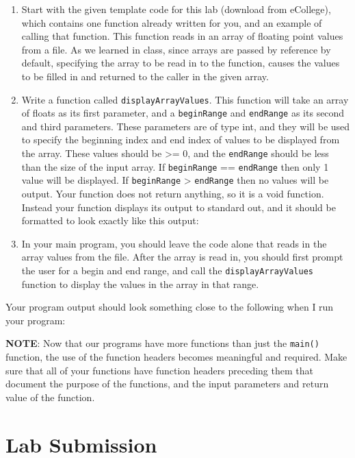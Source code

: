\documentclass[11pt]{article}
\begin{document}
\begin{enumerate}
\item Start with the given template code for this lab (download from
eCollege), which contains one function already written for you, and
an example of calling that function.  This function reads in an
array of floating point values from a file.  As we learned in
class, since arrays are passed by reference by default, specifying
the array to be read in to the function, causes the values to be
filled in and returned to the caller in the given array.

\item Write a function called \verb~displayArrayValues~.  This function will
take an array of floats as its first parameter, and a \verb~beginRange~
and \verb~endRange~ as its second and third parameters.  These
parameters are of type int, and they will be used to specify the
beginning index and end index of values to be displayed from the
array.  These values should be >= 0, and the \verb~endRange~ should be
less than the size of the input array.  If \verb~beginRange~ ==
\verb~endRange~ then only 1 value will be displayed.  If \verb~beginRange~ >
\verb~endRange~ then no values will be output. Your function does not
return anything, so it is a void function.  Instead your function
displays its output to standard out, and it should be formatted to
look exactly like this output:

\item In your main program, you should leave the code alone that reads in
the array values from the file.  After the array is read in, you
should first prompt the user for a begin and end range, and call the
\verb~displayArrayValues~ function to display the values in the array in
that range.
\end{enumerate}

Your program output should look something close to the following when I
run your program:

\textbf{NOTE}: Now that our programs have more functions than just the
\verb~main()~ function, the use of the function headers becomes meaningful
and required.  Make sure that all of your functions have function
headers preceding them that document the purpose of the functions, and
the input parameters and return value of the function.
\section*{Lab Submission}
\label{sec-4}
\end{document}
